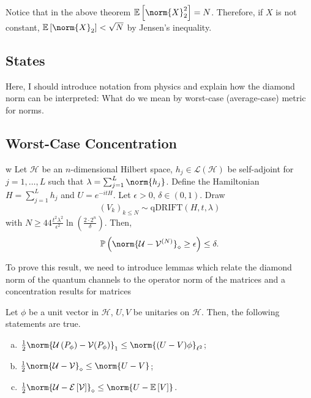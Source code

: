 Notice that in the above theorem \( \mathbb{E}\left[\norm{X}_{2}^{2}\right]=N \). Therefore, if  \( X \) is not constant, \( \mathbb{E}\left[\norm{X}_{2}\right] < \sqrt{N} \) by Jensen's inequality. 

\subsection{States}
Here, I should introduce notation from physics and explain how the diamond norm can be interpreted: What do we mean by worst-case (average-case) metric for norms.

\subsection{Worst-Case Concentration}

\begin{thm}
  \label{worstcaseconc}w
    Let \( \mathcal{H} \) be an \( n \)-dimensional Hilbert space, \( h_j \in \mathcal{L}(\mathcal{H}) \) be self-adjoint for \( j = 1, \dots, L \) such that \( \lambda= \sum_{j=1}^{L} \norm{h_j}_{} \). Define the Hamiltonian \( H=\sum_{j=1}^{L}h_j \) and \( U=e^{-itH} \). Let \( \epsilon>0,\, \delta \in (0,1) \). Draw 
    \[ (V_k)_{k\leq N} \sim \text{qDRIFT}(H,t,\lambda) \]
    with \( N \geq 44 \frac{t^{2}\lambda^{2}}{\epsilon^{2}}\operatorname{ln}\left(\frac{2\cdot 2^{n}}{\delta}\right) \).
    Then,
    \[ \mathbb{P}\left(\norm{\mathcal{U}-\mathcal{V}^{(N)}}_{ \diamond}\geq \epsilon\right) \leq \delta .\]
\end{thm}

To prove this result, we need to introduce lemmas which relate the diamond norm of the quantum channels to the operator norm of the matrices and a concentration results for matrices

\begin{lem}[]
  \label{diamond}
    Let \( \phi \) be a unit vector in \( \mathcal{H} \), \( U,V \) be unitaries on \( \mathcal{H} \). Then, the following statements are true.
    \begin{enumerate}[l)]
      \item \( \frac{1}{2} \norm{\mathcal{U}\left(P_{\phi }\right)- \mathcal{V}(P_{\phi})}_{1} \leq \norm{(U-V)\phi }_{\ell^{2}} \);
      \item \( \frac{1}{2} \norm{\mathcal{U}-\mathcal{V}}_{\diamond} \leq \norm{U-V} \);
      \item \( \frac{1}{2} \norm{\mathcal{U}-\mathcal{E}\left[\mathcal{V}\right]}_{\diamond} \leq \norm{U-\mathbb{E}\left[V\right]}_{}\).
    \end{enumerate}
    
\end{lem}


